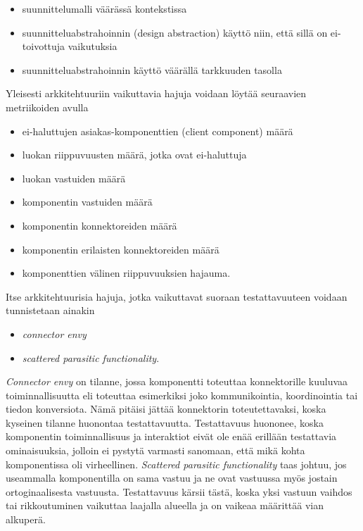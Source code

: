 \documentclass[finnish]{tktltiki2}
\theoremstyle{definition}
\theoremstyle{remark}
\begin{document}
\begin{itemize}
	\item suunnittelumalli väärässä kontekstissa
	\item suunnitteluabstrahoinnin (design abstraction) käyttö niin, että sillä on ei-toivottuja vaikutuksia
	\item suunnitteluabstrahoinnin käyttö väärällä tarkkuuden tasolla 
\end{itemize} 


Yleisesti arkkitehtuuriin vaikuttavia hajuja voidaan löytää seuraavien metriikoiden avulla \citep[s. 1093]{bertran_detecting_2011}

\begin{itemize}
	\item ei-haluttujen asiakas-komponenttien (client component) määrä
	\item luokan riippuvuusten määrä, jotka ovat ei-haluttuja
	\item luokan vastuiden määrä
	\item komponentin vastuiden määrä
	\item komponentin konnektoreiden määrä
	\item komponentin erilaisten konnektoreiden määrä
	\item komponenttien välinen riippuvuuksien hajauma.
\end{itemize}

Itse arkkitehtuurisia hajuja, jotka vaikuttavat suoraan testattavuuteen voidaan tunnistetaan ainakin \citep{garcia_identifying_2009}

\begin{itemize}
	\item \textit{connector envy}
	\item \textit{scattered parasitic functionality}.
\end{itemize}

\noindent
\textit{Connector envy} on tilanne, jossa komponentti toteuttaa konnektorille kuuluvaa toiminnallisuutta eli toteuttaa esimerkiksi joko kommunikointia, koordinointia tai tiedon konversiota. Nämä pitäisi jättää konnektorin toteutettavaksi, koska kyseinen tilanne huonontaa testattavuutta. Testattavuus huononee, koska komponentin toiminnallisuus ja interaktiot eivät ole enää erillään testattavia ominaisuuksia, jolloin ei pystytä varmasti sanomaan, että mikä kohta komponentissa oli virheellinen. \textit{Scattered parasitic functionality} taas johtuu, jos useammalla komponentilla on sama vastuu ja ne ovat vastuussa myös jostain ortoginaalisesta vastuusta. Testattavuus kärsii tästä, koska yksi vastuun vaihdos tai rikkoutuminen vaikuttaa laajalla alueella ja on vaikeaa määrittää vian alkuperä. 
\end{document}
